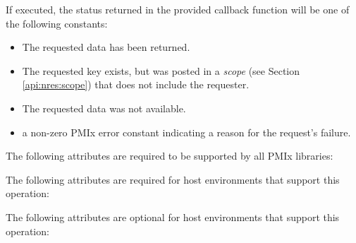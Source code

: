\begin{arglist}
\end{arglist}

\returnsimplenb

If executed, the status returned in the provided callback function will be one of the following constants:

\begin{itemize}
\item {} The requested data has been returned.
\item {} The requested key exists, but was posted in a \emph{scope} (see Section \ref{api:nres:scope}) that does not include the requester.
\item {} The requested data was not available.
\item a non-zero \ac{PMIx} error constant indicating a reason for the request's failure.
\end{itemize}

\reqattrstart
The following attributes are required to be supported by all \ac{PMIx} libraries:


\divider

The following attributes are required for host environments that support this operation:


\reqattrend

\optattrstart
The following attributes are optional for host environments that support this operation:


\optattrend

\descr

